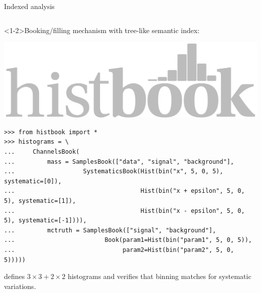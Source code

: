\documentclass[aspectratio=169]{beamer}
\begin{document}
\begin{frame}[fragile]{Indexed analysis}
\vspace{0.1 cm}
\begin{columns}
\begin{onlyenv}<1-2>Booking/filling mechanism with tree-like semantic index:

\hfill \includegraphics[height=1 cm]{histbook-logo.pdf}

\vspace{-1 cm}
\scriptsize
\begin{verbatim}
>>> from histbook import *
>>> histograms = \
...     ChannelsBook(
...         mass = SamplesBook(["data", "signal", "background"],
...                   SystematicsBook(Hist(bin("x", 5, 0, 5), systematic=[0]),
...                                   Hist(bin("x + epsilon", 5, 0, 5), systematic=[1]),
...                                   Hist(bin("x - epsilon", 5, 0, 5), systematic=[-1]))),
...         mctruth = SamplesBook(["signal", "background"],
...                         Book(param1=Hist(bin("param1", 5, 0, 5)),
...                              param2=Hist(bin("param2", 5, 0, 5)))))
\end{verbatim}

\normalsize
defines $3\times 3 + 2\times2$ histograms and verifies that binning matches for systematic variations.


\end{onlyenv}
\end{columns}
\end{frame}
\end{document}
